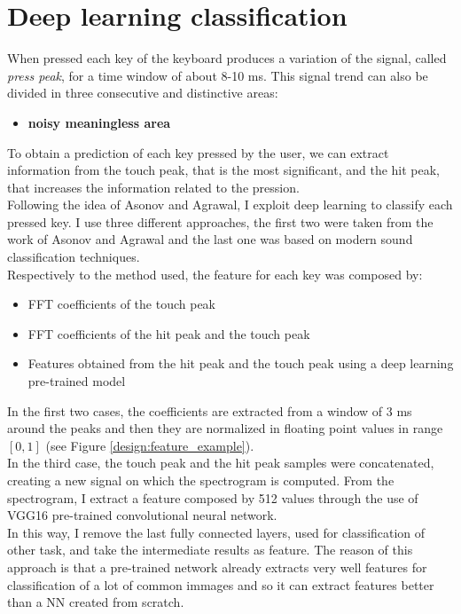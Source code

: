 \section{Deep learning classification}
When pressed each key of the keyboard produces a variation of the signal, called \textit{press peak}, for a time window of about 8-10 ms\cite{keyboard_acoustic}. This signal trend can also be divided in three consecutive and distinctive areas:
\begin{itemize}
\item{\textbf{noisy meaningless area}}
\end{itemize}
To obtain a prediction of each key pressed by the user, we can extract information from the touch peak, that is the most significant, and the hit peak, that increases the information related to the pression.\\
Following the idea of Asonov and Agrawal, I exploit deep learning to classify each pressed key. I use three different approaches, the first two were taken from the work of Asonov and Agrawal and the last one was based on modern sound classification techniques.\\
Respectively to the method used, the feature for each key was composed by:
\begin{itemize}
\item{FFT coefficients of the touch peak}
\item{FFT coefficients of the hit peak and the touch peak}
\item{Features obtained from the hit peak and the touch peak using a deep learning pre-trained model}
\end{itemize}
In the first two cases, the coefficients are extracted from a window of 3 ms around the peaks and then they are normalized in floating point values in range $[0, 1]$ (see Figure \ref{design:feature_example}).\\
In the third case, the touch peak and the hit peak samples were concatenated, creating a new signal on which the spectrogram is computed. From the spectrogram, I extract a feature composed by 512 values through the use of VGG16 pre-trained convolutional neural network.\\
In this way, I remove the last fully connected layers, used for classification of other task, and take the intermediate results as feature. The reason of this approach is that a pre-trained network already extracts very well features for classification of a lot of common immages and so it can extract features better than a NN created from scratch.
